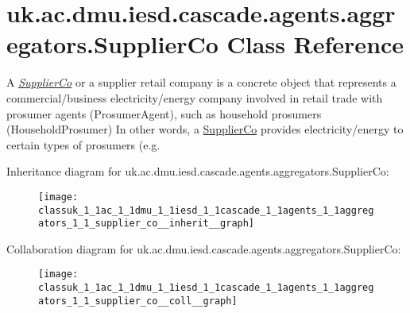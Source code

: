 \hypertarget{classuk_1_1ac_1_1dmu_1_1iesd_1_1cascade_1_1agents_1_1aggregators_1_1_supplier_co}{\section{uk.\-ac.\-dmu.\-iesd.\-cascade.\-agents.\-aggregators.\-Supplier\-Co Class Reference}
\label{classuk_1_1ac_1_1dmu_1_1iesd_1_1cascade_1_1agents_1_1aggregators_1_1_supplier_co}
}


A {\itshape \hyperlink{classuk_1_1ac_1_1dmu_1_1iesd_1_1cascade_1_1agents_1_1aggregators_1_1_supplier_co}{Supplier\-Co}} or a supplier retail company is a concrete object that represents a commercial/business electricity/energy company involved in retail trade with prosumer agents ({\ttfamily Prosumer\-Agent}), such as household prosumers ({\ttfamily Household\-Prosumer}) In other words, a {\ttfamily \hyperlink{classuk_1_1ac_1_1dmu_1_1iesd_1_1cascade_1_1agents_1_1aggregators_1_1_supplier_co}{Supplier\-Co}} provides electricity/energy to certain types of prosumers (e.\-g.  




Inheritance diagram for uk.\-ac.\-dmu.\-iesd.\-cascade.\-agents.\-aggregators.\-Supplier\-Co\-:\nopagebreak
\begin{figure}[H]
\begin{center}
\leavevmode
\texttt{[image: classuk\_1\_1ac\_1\_1dmu\_1\_1iesd\_1\_1cascade\_1\_1agents\_1\_1aggregators\_1\_1\_supplier\_co\_\_inherit\_\_graph]}
\end{center}
\end{figure}


Collaboration diagram for uk.\-ac.\-dmu.\-iesd.\-cascade.\-agents.\-aggregators.\-Supplier\-Co\-:\nopagebreak
\begin{figure}[H]
\begin{center}
\leavevmode
\texttt{[image: classuk\_1\_1ac\_1\_1dmu\_1\_1iesd\_1\_1cascade\_1\_1agents\_1\_1aggregators\_1\_1\_supplier\_co\_\_coll\_\_graph]}
\end{center}
\end{figure}
